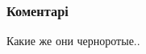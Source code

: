  
 
 
 
 
\subsubsection{Коментарі}
\label{sec:26_07_2021.fb.berdnik_miroslava.3.harkov_prodavschica.cmt}

\begin{itemize}
 
Какие же они черноротые..

\end{itemize}

